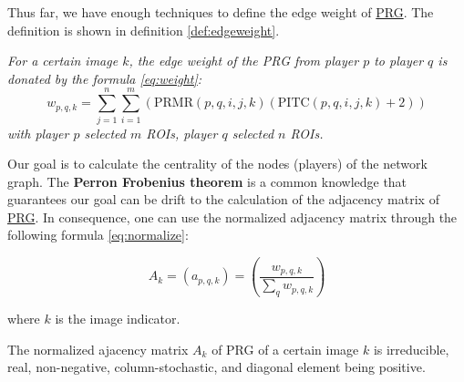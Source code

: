 Thus far, we have enough techniques to define the edge weight of \hyperref[abbr:prg]{PRG}.
The definition is shown in definition \ref{def:edgeweight}.

\begin{definition}
\label{def:edgeweight}
\emph{
For a certain image $k$, the edge weight of the PRG from player $p$ to player $q$ is donated 
by the formula \ref{eq:weight}:
\begin{equation}
\label{eq:weight}
w_{p,q,k} = 
\sum_{j=1}^{n}{
\sum_{i=1}^{m}{ \left(
  \text{PRMR}(p, q, i, j, k)
  \left(
    \text{PITC}(p, q, i, j, k) + 2
  \right)
\right)}}
\end{equation}
with player $p$ selected $m$ ROIs, player $q$ selected $n$ ROIs.
}
\end{definition}

Our goal is to calculate the centrality of the nodes (players) of the network graph.
The \textbf{Perron Frobenius theorem} \cite{wiki:PerronFrobeniusTheorem} is a common knowledge that guarantees our goal
can be drift to the calculation of the adjacency matrix of \hyperref[abbr:prg]{PRG}.
In consequence, one can use the normalized adjacency matrix through the following formula \ref{eq:normalize}:

\begin{equation}
\label{eq:normalize}
A_k = (a_{p,q,k}) = (\frac{w_{p,q,k}}{\sum_{q}{w_{p,q,k}}})
\end{equation}

where $k$ is the image indicator.

\begin{theorem}
The normalized ajacency matrix $A_k$ of PRG of a certain image $k$ is irreducible, real, 
non-negative, column-stochastic, and diagonal element being positive.
\end{theorem}


